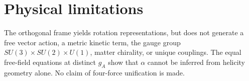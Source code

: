 \documentclass[11pt]{article}
\begin{document}
\section*{Physical limitations}
The orthogonal frame yields rotation representations, but does not generate a free vector action, a metric kinetic term, the gauge group $SU(3)\times SU(2)\times U(1)$, matter chirality, or unique couplings. The equal free-field equations at distinct $g_A$ show that $\alpha$ cannot be inferred from helicity geometry alone. No claim of four-force unification is made.
\end{document}

